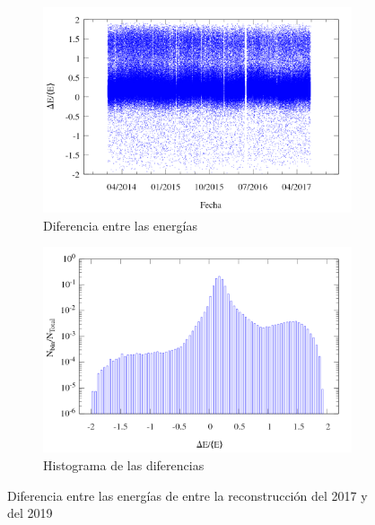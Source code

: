         \begin{figure}[H]
          \centering
            \begin{subfigure}[b]{0.5\textwidth}
              \centering
              \includegraphics[width=\linewidth]{deltaE_tiempo_v1.png}
              \caption{Diferencia entre las energías} \label{fig:deltaE}
            \end{subfigure}%
            \begin{subfigure}[b]{0.5\textwidth}
              \centering
              \includegraphics[width=\linewidth]{histograma_deltaE_v2.png}
              \caption{Histograma de las diferencias}   \label{fig:histograma}
            \end{subfigure}
           \caption{Diferencia entre las energías de entre la reconstrucción del 2017 y del 2019}
         \end{figure}
	
